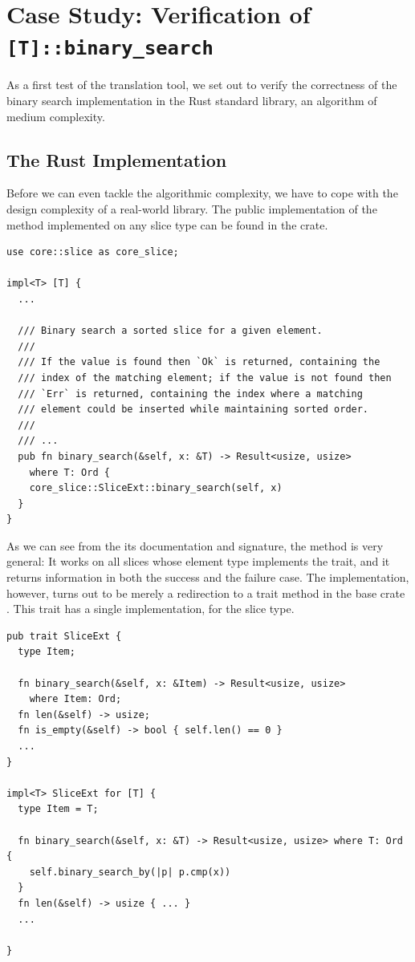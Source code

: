 \section{Case Study: Verification of \texttt{[T]::binary\_search}}
\label{sec:binary_search}

As a first test of the translation tool, we set out to verify the correctness
of the binary search implementation in the Rust standard library, an algorithm of
medium complexity.

\subsection{The Rust Implementation}

Before we can even tackle the algorithmic complexity, we have to cope with the
design complexity of a real-world library. The public implementation of the
 method implemented on any slice type can be found in the  crate.

\begin{verbatim}
use core::slice as core_slice;

impl<T> [T] {
  ...

  /// Binary search a sorted slice for a given element.
  ///
  /// If the value is found then `Ok` is returned, containing the
  /// index of the matching element; if the value is not found then
  /// `Err` is returned, containing the index where a matching
  /// element could be inserted while maintaining sorted order.
  ///
  /// ...
  pub fn binary_search(&self, x: &T) -> Result<usize, usize>
    where T: Ord {
    core_slice::SliceExt::binary_search(self, x)
  }
}
\end{verbatim}

As we can see from the its documentation and signature, the method
is very general: It works on all slices whose element type implements the
 trait, and it returns information in both the success and the failure
case. The implementation, however, turns out to be merely a redirection to a
trait method in the base crate . This trait has a single
implementation, for the slice type.

\begin{verbatim}
pub trait SliceExt {
  type Item;

  fn binary_search(&self, x: &Item) -> Result<usize, usize>
    where Item: Ord;
  fn len(&self) -> usize;
  fn is_empty(&self) -> bool { self.len() == 0 }
  ...
}

impl<T> SliceExt for [T] {
  type Item = T;

  fn binary_search(&self, x: &T) -> Result<usize, usize> where T: Ord {
    self.binary_search_by(|p| p.cmp(x))
  }
  fn len(&self) -> usize { ... }
  ...

}
\end{verbatim}

